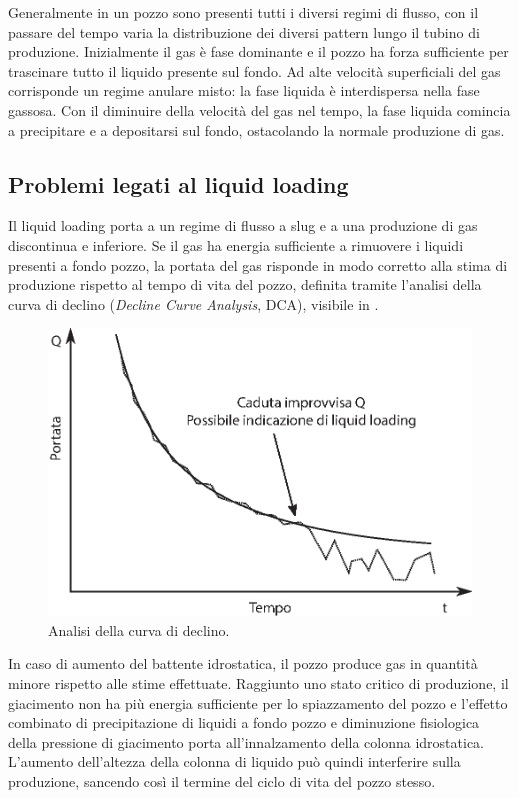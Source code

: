 Generalmente in un pozzo sono presenti tutti i diversi regimi di flusso, con il passare del tempo varia la distribuzione dei diversi pattern lungo il tubino di produzione. Inizialmente il gas è fase dominante e il pozzo ha forza sufficiente per trascinare tutto il liquido presente sul fondo. Ad alte velocità superficiali del gas corrisponde un regime anulare misto: la fase liquida è interdispersa nella fase gassosa. Con il diminuire della velocità del gas nel tempo, la fase liquida comincia a precipitare e a depositarsi sul fondo, ostacolando la normale produzione di gas.

\subsection{Problemi legati al liquid loading}
Il liquid loading porta a un regime di flusso a slug e a una produzione di gas discontinua e inferiore. Se il gas ha energia sufficiente a rimuovere i liquidi presenti a fondo pozzo, la portata del gas risponde in modo corretto alla stima di produzione rispetto al tempo di vita del pozzo, definita tramite l'analisi della curva di declino (\textit{Decline Curve Analysis}, DCA), visibile in .

\begin{figure}[htbp]
    \centering
    \includegraphics[width=.8\textwidth]{fig/foamer/declinecurve.eps}
    \caption{Analisi della curva di declino.}
    \label{fig:declinecurve}
\end{figure}

In caso di aumento del battente idrostatica, il pozzo produce gas in quantità minore rispetto alle stime effettuate. Raggiunto uno stato critico di produzione, il giacimento non ha più energia sufficiente per lo spiazzamento del pozzo e l'effetto combinato di precipitazione di liquidi a fondo pozzo e diminuzione fisiologica della pressione di giacimento porta all'innalzamento della colonna idrostatica. L'aumento dell'altezza della colonna di liquido può quindi interferire sulla produzione, sancendo così il termine del ciclo di vita del pozzo stesso.
 
